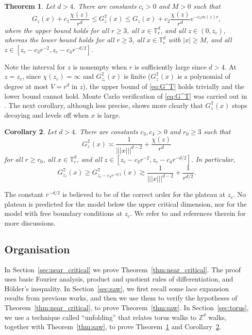 \documentclass[11pt,hidelinks]{article}
\theoremstyle{plain}
\newtheorem{theorem}{Theorem}[section]
\newtheorem{corollary}[theorem]{Corollary}
\numberwithin{equation}{section}
\newcommand{\Z}{\mathbb{Z}}
\newcommand{\T}{\mathbb{T}}
\renewcommand{\(}{\left(}
\renewcommand{\)}{\right)}
\newcommand{\1}{\mathds{1}}
\providecommand{\abs}[1]{\lvert#1\rvert}
\newcommand{\supT}{^{ \mathbb{T} }}
\newcommand{\veee}[1]{|\!|\!|#1|\!|\!|}
\providecommand{\nnnorm}[1]{\veee {#1} }
\newcommand{\crit}{_{z_c}}
\begin{document}
\begin{theorem}
\label{thm:torus}
Let $d>4$. 
There are constants $c_i>0$ and $M > 0$ such that 
\begin{equation} \label{eq:G^T}
G_z(x) + c_1 \frac{ \chi(z) }{ r^d }
\le G_z\supT(x)
\le G_z(x) + c_2 \frac{ \chi(z) }{ r^d } e^{-c_5 m(z) r}, 
\end{equation}
where the upper bound holds for all $r\ge3$, all $x\in \T^d_r$, and all $z\in (0,z_c)$, 
whereas the lower bound holds for all $r\ge 3$, all $x\in \T^d_r$ with $\abs x \ge M$, and all $z\in [ z_c - c_3 r^{-2}, z_c - c_4 r^{-d/2} ]$. 
\end{theorem}

Note the interval for $z$ is nonempty when $r$ is sufficiently large since $d>4$. 
At $z=z_c$, since $\chi(z_c) = \infty$ and $G\supT\crit(x)$ is finite ($G_z\supT(x)$ is a polynomial of degree at most $V = r^d$ in $z$), the upper bound of \eqref{eq:G^T} holds trivially and the lower bound cannot hold. 
Monte Carlo verification of \eqref{eq:G^T} was carried out in \cite{DGGZ24,ZGFDG18}. 
The next corollary, although less precise, shows more clearly that $G_z\supT(x)$ stops decaying and levels off when $x$ is large. 

\begin{corollary} \label{cor:torus}
Let $d>4$. There are constants $c_3, c_4 >0$ and $r_0 \ge 3$ such that
\begin{equation} \label{eq:G_cor}
G_z\supT(x) \asymp \frac 1 { \nnnorm x^{d-2} } + \frac{ \chi(z) }{ r^d }
\end{equation}
for all $r\ge r_0$, all $x\in \T^d_r$, and all $z\in [ z_c - c_3 r^{-2}, z_c - c_4 r^{-d/2} ]$. 
In particular, 
\begin{equation}
G\crit \supT(x) 
\ge G_{z_c - c_4 r^{-d/2}}\supT(x)
\gtrsim \frac 1 { \nnnorm x^{d-2} } + \frac{ 1 }{ r^{d/2} } .
\end{equation}
\end{corollary} 

The constant $r^{-d/2}$ is believed to be of the correct order for the plateau at $z_c$. No plateau is predicted for the model below the upper critical dimension, nor for the model with free boundary conditions at $z_c$.
We refer to \cite{LPS25-universal, Slad23_wsaw, MPS23} and references therein for more discussions.




\subsection{Organisation}
In Section~\ref{sec:near_critical} we prove Theorem~\ref{thm:near_critical}. The proof uses basic Fourier analysis, product and quotient rules of differentiation, and H\"older's inequality. 
In Section~\ref{sec:saw}, we first recall some lace expansion results from previous works, and then we use them to verify the hypotheses of Theorem~\ref{thm:near_critical}, to prove Theorem~\ref{thm:saw}.
In Section~\ref{sec:torus}, we use a technique called ``unfolding'' that relates torus walks to $\Z^d$ walks, together with Theorem~\ref{thm:saw}, to prove Theorem~\ref{thm:torus} and Corollary~\ref{cor:torus}.
\end{document}
